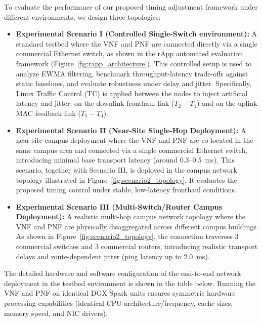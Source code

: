 \documentclass[../my_ntust_thesis.tex]{subfiles}
\begin{document}
To evaluate the performance of our proposed timing adjustment framework under different environments, we design three topologies:
\begin{itemize}
\item \textbf{Experimental Scenario I (Controlled Single-Switch environment):} A standard testbed where the VNF and PNF are connected directly via a single commercial Ethernet switch, as shown in the rApp automated evaluation framework (Figure~\ref{fig:rapp_architecture}). This controlled setup is used to analyze EWMA filtering, benchmark throughput-latency trade-offs against static baselines, and evaluate robustness under delay and jitter. Specifically, Linux Traffic Control (TC) is applied between the nodes to inject artificial latency and jitter: on the downlink fronthaul link ($T_2-T_1$) and on the uplink MAC feedback link ($T_5-T_4$).
\item \textbf{Experimental Scenario II (Near-Site Single-Hop Deployment):} A near-site campus deployment where the VNF and PNF are co-located in the same campus area and connected via a single commercial Ethernet switch, introducing minimal base transport latency (around 0.3--0.5~ms). This scenario, together with Scenario III, is deployed in the campus network topology illustrated in Figure~\ref{fig:scenario2_topology}. It evaluates the proposed timing control under stable, low-latency fronthaul conditions.
\item \textbf{Experimental Scenario III (Multi-Switch/Router Campus Deployment):} A realistic multi-hop campus network topology where the VNF and PNF are physically disaggregated across different campus buildings. As shown in Figure~\ref{fig:scenario2_topology}, the connection traverses $3$ commercial switches and $3$ commercial routers, introducing realistic transport delays and route-dependent jitter (ping latency up to 2.0~ms).
\end{itemize}

The detailed hardware and software configuration of the end-to-end network deployment in the testbed environment is shown in the table below. Running the VNF and PNF on identical DGX Spark units ensures symmetric hardware processing capabilities (identical CPU architecture/frequency, cache sizes, memory speed, and NIC drivers).
\end{document}
